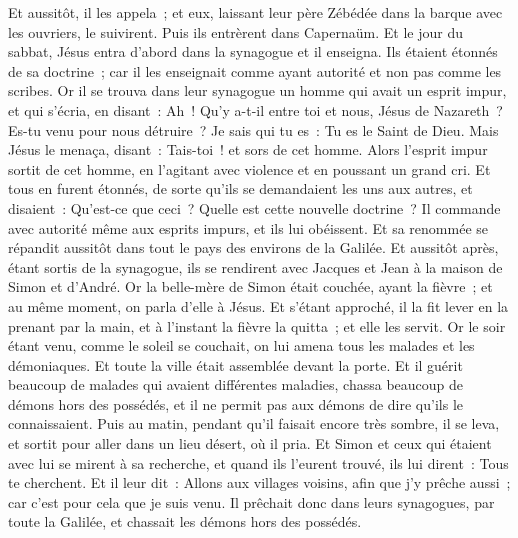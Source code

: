 \begin{multicols}{2}
Et aussitôt, il les appela~; et eux, laissant leur père Zébédée dans la barque avec les ouvriers, le suivirent.
Puis ils entrèrent dans Capernaüm. Et le jour du sabbat, Jésus entra d'abord dans la synagogue et il enseigna.
Ils étaient étonnés de sa doctrine~; car il les enseignait comme ayant autorité et non pas comme les scribes.
Or il se trouva dans leur synagogue un homme qui avait un esprit impur, et qui s'écria,
en disant~: Ah~! Qu'y a-t-il entre toi et nous, Jésus de Nazareth~? Es-tu venu pour nous détruire~? Je sais qui tu es~: Tu es le Saint de Dieu.
Mais Jésus le menaça, disant~: Tais-toi~! et sors de cet homme.
Alors l'esprit impur sortit de cet homme, en l'agitant avec violence et en poussant un grand cri.
Et tous en furent étonnés, de sorte qu'ils se demandaient les uns aux autres, et disaient~: Qu'est-ce que ceci~? Quelle est cette nouvelle doctrine~? Il commande avec autorité même aux esprits impurs, et ils lui obéissent.
Et sa renommée se répandit aussitôt dans tout le pays des environs de la Galilée.
Et aussitôt après, étant sortis de la synagogue, ils se rendirent avec Jacques et Jean à la maison de Simon et d'André.
Or la belle-mère de Simon était couchée, ayant la fièvre~; et au même moment, on parla d'elle à Jésus.
Et s'étant approché, il la fit lever en la prenant par la main, et à l'instant la fièvre la quitta~; et elle les servit.
Or le soir étant venu, comme le soleil se couchait, on lui amena tous les malades et les démoniaques.
Et toute la ville était assemblée devant la porte.
Et il guérit beaucoup de malades qui avaient différentes maladies, chassa beaucoup de démons hors des possédés, et il ne permit pas aux démons de dire qu'ils le connaissaient.
Puis au matin, pendant qu'il faisait encore très sombre, il se leva, et sortit pour aller dans un lieu désert, où il pria.
Et Simon et ceux qui étaient avec lui se mirent à sa recherche,
et quand ils l'eurent trouvé, ils lui dirent~: Tous te cherchent.
Et il leur dit~: Allons aux villages voisins, afin que j'y prêche aussi~; car c'est pour cela que je suis venu.
Il prêchait donc dans leurs synagogues, par toute la Galilée, et chassait les démons hors des possédés.

\end{multicols}
